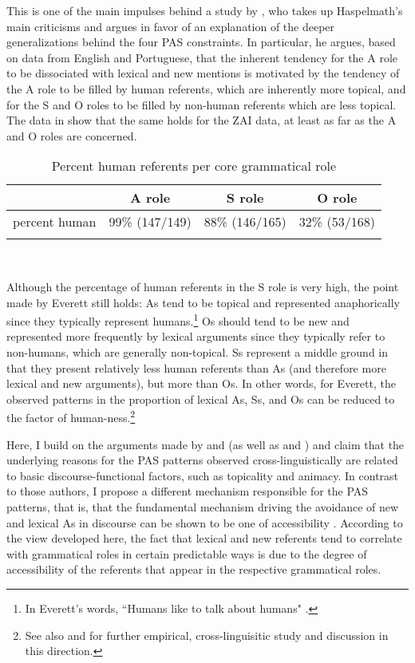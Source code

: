This is one of the main impulses behind a study by \citet{everett2009}, who takes up Haspelmath's main criticisms and argues in favor of an explanation of the deeper generalizations behind the four PAS constraints. In particular, he argues, based on data from English and Portuguese, that the inherent tendency for the A role to be dissociated with lexical and new mentions is motivated by the tendency of the A role to be filled by human referents, which are inherently more topical, and for the S and O roles to be filled by non-human referents which are less topical. The data in  show that the same holds for the ZAI data, at least as far as the A and O roles are concerned.

\begin{table} 

\caption{{Percent human referents per core grammatical role}}
\begin{tabular}{ r  c  c  c }
\lsptoprule
 & A role & S role & O role\\

\midrule
percent human & 99{\%} (147/149) & 88{\%} (146/165) & 32{\%} (53/168)  \\
  
\lspbottomrule
\end{tabular}\\
\label{humandist}

\end{table}
Although the percentage of human referents in the S role is very high, the point made by Everett still holds: As tend to be topical and represented anaphorically since they typically represent humans.\footnote{In Everett's words, ``Humans like to talk about humans" \citep[21]{everett2009}.} Os should tend to be new and represented more frequently by lexical arguments since they typically refer to non-humans, which are generally non-topical. Ss represent a middle ground in that they present relatively less human referents than As (and therefore more lexical and new arguments), but more than Os. In other words, for Everett, the observed patterns in the proportion of lexical As, Ss, and Os can be reduced to the factor of human-ness.\footnote{See also \citet{haig2016} and \citet{schnell2017} for further empirical, cross-linguisitic study and discussion in this direction.} 

Here, I build on the arguments made by \citet{haspelmath2006} and \citet{everett2009} (as well as \citet{haig2016} and \citet{schnell2017}) and claim that the underlying reasons for the PAS patterns observed cross-linguistically are related to basic discourse-functional factors, such as topicality and animacy. In contrast to those authors, I propose a different mechanism responsible for the PAS patterns, that is, that the fundamental mechanism driving the avoidance of new and lexical As in discourse can be shown to be one of accessibility \citep{ariel1990,ariel2001}. According to the view developed here, the fact that lexical and new referents tend to correlate with grammatical roles in certain predictable ways is due to the degree of accessibility of the referents that appear in the respective grammatical roles.

